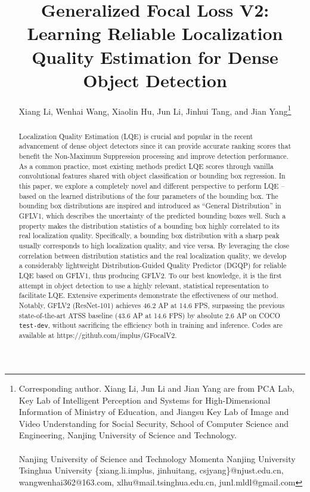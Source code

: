 \documentclass[10pt,twocolumn,letterpaper]{article}
\begin{document}
\title{Generalized Focal Loss V2: Learning Reliable Localization Quality Estimation for Dense Object Detection} 

\author[]{Xiang Li, Wenhai Wang, Xiaolin Hu, Jun Li, Jinhui Tang, and Jian Yang\thanks{Corresponding author. Xiang Li, Jun Li and Jian Yang are from PCA Lab, Key Lab of Intelligent Perception and Systems for High-Dimensional Information of Ministry of Education, and Jiangsu Key Lab of Image and Video Understanding for Social Security, School of Computer Science and Engineering, Nanjing University of Science and Technology. \\ \\  Nanjing University of Science and Technology Momenta Nanjing University Tsinghua University \scriptsize \{xiang.li.implus, jinhuitang, csjyang\}@njust.edu.cn, wangwenhai362@163.com, xlhu@mail.tsinghua.edu.cn, junl.mldl@gmail.com}}



\maketitle
\begin{abstract}
   Localization Quality Estimation (LQE) is crucial and popular in the recent advancement of dense object detectors since it can provide accurate ranking scores that benefit the Non-Maximum Suppression processing and improve detection performance. As a common practice, most existing methods predict LQE scores through vanilla convolutional features shared with object classification or bounding box regression. In this paper, we explore a completely novel and different perspective to perform LQE -- based on the learned distributions of the four parameters of the bounding box. The bounding box distributions are inspired and introduced as ``General Distribution'' in GFLV1, which describes the uncertainty of the predicted bounding boxes well. Such a property makes the distribution statistics of a bounding box highly correlated to its real localization quality. Specifically, a bounding box distribution with a sharp peak usually corresponds to high localization quality, and vice versa. By leveraging the close correlation between distribution statistics and the real localization quality, we develop a considerably lightweight Distribution-Guided Quality Predictor (DGQP) for reliable LQE based on GFLV1, thus producing GFLV2. To our best knowledge, it is the first attempt in object detection to use a highly relevant, statistical representation to facilitate LQE. Extensive experiments demonstrate the effectiveness of our method. Notably, GFLV2 (ResNet-101) achieves 46.2 AP at 14.6 FPS, surpassing the previous state-of-the-art ATSS baseline (43.6 AP at 14.6 FPS) by absolute 2.6 AP on COCO {\tt test-dev}, without sacrificing the efficiency both in training and inference. Codes are available at https://github.com/implus/GFocalV2.


   


 
\end{abstract}
\end{document}
